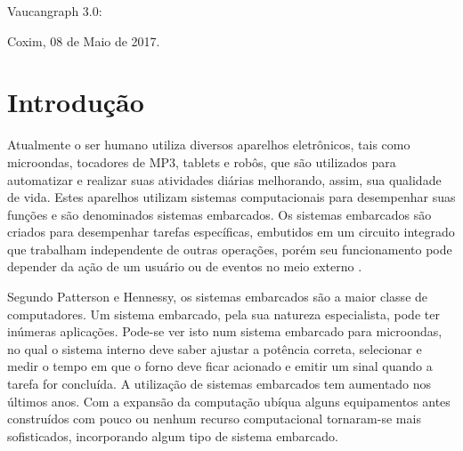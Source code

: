 \documentclass[a4paper,12pt,brazil]{ufms-cpcx}
\begin{document}
\begin{center}
	
	\begin{minipage}[t]{10cm}
		\begin{center}
			\vspace{-2cm}
			{{\Large Vaucangraph 3.0: }}  
		\end{center}
	\end{minipage}
	
\end{center}

\vskip 3.0cm 

\begin{flushright}
	\vspace{12cm}
	Coxim, 08 de Maio de 2017.
\end{flushright}









\chapter{Introdução}

Atualmente o ser humano utiliza diversos aparelhos eletrônicos, tais como microondas, tocadores de MP3, tablets e robôs, que são utilizados para automatizar e realizar suas atividades diárias melhorando, assim, sua qualidade de vida. Estes aparelhos utilizam sistemas computacionais para desempenhar suas funções e são denominados sistemas embarcados. Os sistemas embarcados são criados para desempenhar tarefas específicas, embutidos em um circuito integrado que trabalham independente de outras operações, porém seu funcionamento pode depender da ação de um usuário ou de eventos no meio externo \cite{Cunha:2007}.

Segundo Patterson e Hennessy\cite{Patterson:2007}, os sistemas embarcados são a maior classe de computadores. Um sistema embarcado, pela sua natureza especialista, pode ter inúmeras aplicações. Pode-se  ver isto num sistema embarcado para microondas, no qual o sistema interno deve saber ajustar a potência correta, selecionar e medir o tempo em que o forno deve ficar acionado e emitir um sinal quando a tarefa for concluída. A utilização de sistemas embarcados tem aumentado nos últimos anos\cite{Chetan:2005}. Com a expansão da computação ubíqua alguns equipamentos antes construídos com pouco ou nenhum recurso computacional tornaram-se mais sofisticados, incorporando algum tipo de sistema embarcado\cite{Kruger:2014}.
 
\end{document}
